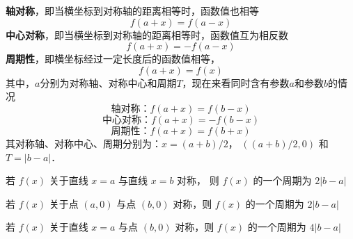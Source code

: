 
\textbf{轴对称}，即当横坐标到对称轴的距离相等时，函数值也相等
\begin{equation}
f\left( {a + x} \right) = f\left( {a - x} \right)
\end{equation}
\textbf{中心对称}，即当横坐标到对称轴的距离相等时，函数值互为相反数
\begin{equation}
f\left( {a + x} \right) =  - f\left( {a - x} \right)
\end{equation}
\textbf{周期性}，即横坐标经过一定长度后的函数值相等，
\begin{equation}
f\left( {a + x} \right) = f\left( x \right)
\end{equation}
其中，$a$分别为对称轴、对称中心和周期$T$，现在来看同时含有参数$a$和参数$b$的情况
\begin{equation}
轴对称：f\left( {a + x} \right) = f\left( {b - x} \right)
\end{equation}
\begin{equation}
中心对称：f\left( {a + x} \right) =  - f\left( {b - x} \right)
\end{equation}
\begin{equation}
周期性：f\left( {a + x} \right) = f\left( {b + x} \right)
\end{equation}
其对称轴、对称中心、周期分别为：$x = (a + b)/2$， $((a + b)/2, 0)$ 和 $T = \left| {b - a} \right|$．

若 $f(x)$ 关于直线 $x=a$ 与直线 $x=b$ 对称， 则 $f(x)$ 的一个周期为 $2\left| {b - a} \right|$

若 $f(x)$ 关于点 $(a,0)$ 与点 $(b,0)$ 对称，则 $f(x)$ 的一个周期为 $2\left| {b - a} \right|$

若 $f(x)$ 关于直线 $x=a$ 与点 $(b,0)$ 对称，则 $f(x)$ 的一个周期为 $4\left| {b - a} \right|$
